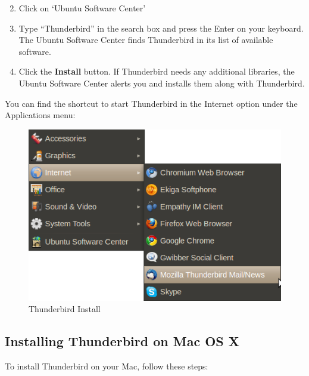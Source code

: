 \begin{enumerate}[1.]
\setcounter{enumi}{1}
\item
  Click on `Ubuntu Software Center'
\item
  Type ``Thunderbird'' in the search box and press the Enter on your
  keyboard. The Ubuntu Software Center finds Thunderbird in its list of
  available software.
\item
  Click the \textbf{Install} button. If Thunderbird needs any additional
  libraries, the Ubuntu Software Center alerts you and installs them
  along with Thunderbird.
\end{enumerate}
You can find the shortcut to start Thunderbird in the Internet option
under the Applications menu:

\begin{figure}[htbp]
\centering
\includegraphics{thunderbird_inst_ubuntu_2.jpg}
\caption{Thunderbird Install}
\end{figure}

\subsection{Installing Thunderbird on Mac OS X}

To install Thunderbird on your Mac, follow these steps:

